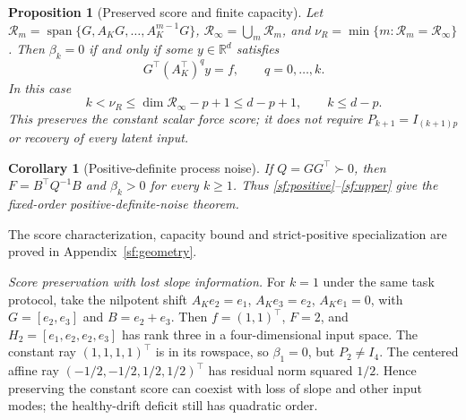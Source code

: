 \documentclass[journal]{IEEEtran}
\newtheorem{proposition}{Proposition}
\newtheorem{corollary}{Corollary}
\begin{document}
\begin{proposition}[Preserved score and finite capacity]\label{sf:capacity}
Let $\mathcal R_m=\operatorname{span}\{G,A_KG,\ldots,A_K^{m-1}G\}$,
$\mathcal R_\infty=\bigcup_m\mathcal R_m$, and
$\nu_R=\min\{m:\mathcal R_m=\mathcal R_\infty\}$.
Then $\beta_k=0$ if and only if some $y\in\mathbb R^d$ satisfies
\begin{equation}\label{sf:score}
G^\top(A_K^\top)^q y=f,\qquad q=0,\ldots,k.
\end{equation}
In this case
\begin{equation}\label{sf:capacity-bound}
k<\nu_R\le\dim\mathcal R_\infty-p+1\le d-p+1,
\qquad k\le d-p.
\end{equation}
This preserves the constant scalar force score; it does not require
$P_{k+1}=I_{(k+1)p}$ or recovery of every latent input.
\end{proposition}

\begin{corollary}[Positive-definite process noise]\label{sf:spd}
If $Q=GG^\top\succ0$, then $F=B^\top Q^{-1}B$ and
$\beta_k>0$ for every $k\ge1$. Thus \eqref{sf:positive}--\eqref{sf:upper}
give the fixed-order positive-definite-noise theorem.
\end{corollary}
The score characterization, capacity bound and strict-positive specialization
are proved in Appendix~\ref{sf:geometry}.

\par\smallskip\noindent\textit{Score preservation with lost slope information.}\enspace 
For $k=1$ under the same task protocol, take the nilpotent shift
$A_Ke_2=e_1$, $A_Ke_3=e_2$, $A_Ke_1=0$, with
$G=[e_2,e_3]$ and $B=e_2+e_3$. Then $f=(1,1)^\top$, $F=2$, and
$H_2=[e_1,e_2,e_2,e_3]$ has rank three in a four-dimensional input space.
The constant ray $(1,1,1,1)^\top$ is in its rowspace, so $\beta_1=0$,
but $P_2\ne I_4$. The centered affine ray
$(-1/2,-1/2,1/2,1/2)^\top$ has residual norm squared $1/2$.
Hence preserving the constant score can coexist with loss of slope and other
input modes; the healthy-drift deficit still has quadratic order.
\end{document}

